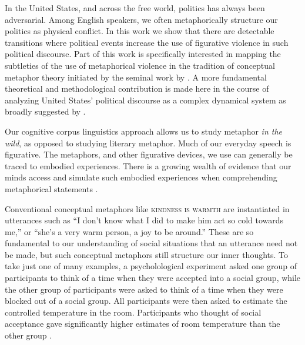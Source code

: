 In the United States, and across the free world, politics has always been
adversarial. Among English speakers, we often metaphorically structure 
our politics as physical conflict. In this work we show that there are detectable
transitions where political events increase the use of figurative violence
in such political discourse. Part of this work is specifically interested in
mapping the subtleties of the use of metaphorical violence in the tradition of
conceptual metaphor theory initiated by the seminal work by .
A more fundamental theoretical and methodological contribution is made here
in the course of analyzing United States' political discourse as a 
complex dynamical system as broadly suggested by .

Our cognitive corpus linguistics approach allows us to study metaphor 
\textit{in the wild}, as opposed to studying literary metaphor. Much of 
our everyday speech is figurative. The metaphors, and other figurative 
devices, we use can generally be traced to embodied experiences. There is a
growing wealth of evidence that our minds access and simulate such 
embodied experiences when comprehending metaphorical statements 
\cite{Gibbs2008}. 

Conventional conceptual metaphors like \textsc{kindness is warmth} are instantiated
in utterances such as ``I don't know what I did to make him act so
cold towards me,'' or ``she's a very warm person, a joy to be around.'' 
These are so fundamental to our understanding of social situations that
an utterance need not be made, but such conceptual metaphors still structure
our inner thoughts.
To take just one of many examples, a psycholological 
experiment asked one group of participants to think of a time when they were
accepted into a social group, while the other group of participants were asked
to think of a time when they were blocked out of a social group. 
All participants were then asked to estimate the controlled 
temperature in the room.  Participants who thought of social acceptance
gave significantly higher estimates of room temperature than the other group
\cite{Lakoff2014, Zhong2008}.

